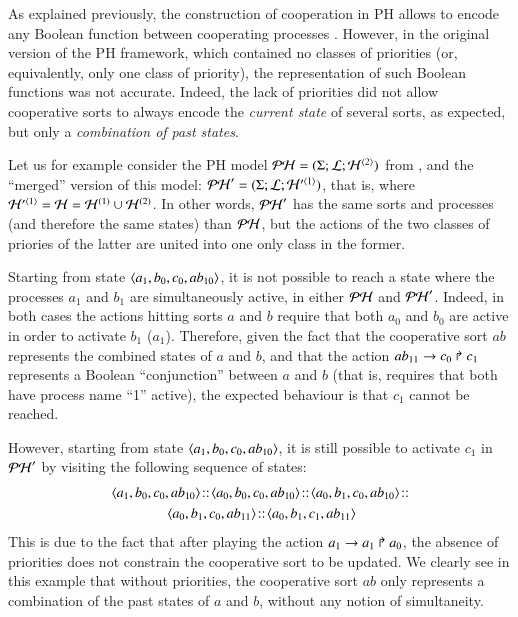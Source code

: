 As explained previously,
the construction of cooperation in PH allows to encode any Boolean function between cooperating processes \cite{PMR10-TCSB}.
However, in the original version of the PH framework,
which contained no classes of priorities
(or, equivalently, only one class of priority),
the representation of such Boolean functions was not accurate.
Indeed, the lack of priorities did not allow cooperative sorts
to always encode the \emph{current state} of several sorts, as expected,
but only a \emph{combination of past states}.

Let us for example consider the PH model
$\mathcal{PH} = (\Sigma; \mathcal{L}; \mathcal{H}^{{\langle 2 \rangle}})$ from ,
and the “merged” version of this model:
$\mathcal{PH}' = (\Sigma; \mathcal{L}; \mathcal{H}'^{{\langle 1 \rangle}})$,
that is, where $\mathcal{H}'^{{\langle 1 \rangle}} = \mathcal{H} = \mathcal{H}^{(1)} \cup \mathcal{H}^{(2)}$.
In other words, $\mathcal{PH}'$ has the same sorts and processes
(and therefore the same states) than $\mathcal{PH}$,
but the actions of the two classes of priories of the latter
are united into one only class in the former.

Starting from state $\mbox{$\langle a_1, b_0, c_0, ab_{10} \rangle$}$,
it is not possible to reach a state where the processes $a_1$ and $b_1$
are simultaneously active, in either $\mathcal{PH}$ and $\mathcal{PH}'$.
Indeed, in both cases the actions hitting sorts $a$ and $b$ require that both
$a_0$ and $b_0$ are active in order to activate $b_1$ (\resp $a_1$).
Therefore, given the fact that the cooperative sort $ab$ represents
the combined states of $a$ and $b$,
and that the action $ab_{11}\rightarrow c_0\Rsh c_1$
represents a Boolean “conjunction” between $a$ and $b$
(that is, requires that both have process name “1” active),
the expected behaviour is that $c_1$ cannot be reached.

However, starting from state $\mbox{$\langle a_1, b_0, c_0, ab_{10} \rangle$}$,
it is still possible to activate $c_1$ in $\mathcal{PH}'$
by visiting the following sequence of states:
\begin{align*}
  & \PHstate{a_1, b_0, c_0, ab_{10}} \concat
    \PHstate{a_0, b_0, c_0, ab_{10}} \concat
    \PHstate{a_0, b_1, c_0, ab_{10}} \concat \\
  & \qquad\qquad
    \PHstate{a_0, b_1, c_0, ab_{11}} \concat
    \PHstate{a_0, b_1, c_1, ab_{11}}
\end{align*}
This is due to the fact that after playing the action
$a_1\rightarrow a_1\Rsh a_0$,
the absence of priorities does not constrain the cooperative sort to be updated.
We clearly see in this example that without priorities,
the cooperative sort $ab$ only represents a combination of the past
states of $a$ and $b$, without any notion of simultaneity.

